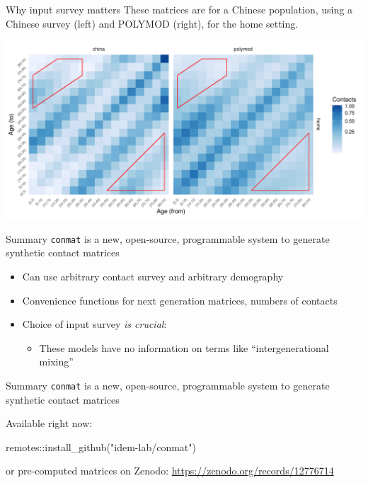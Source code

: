 \documentclass[
  14pt,
  ignorenonframetext,
  aspectratio=169,
]{beamer}
\newenvironment{Shaded}{\begin{snugshade}}{\end{snugshade}}
\newcommand{\FunctionTok}[1]{\textcolor[rgb]{0.28,0.35,0.67}{#1}}
\newcommand{\NormalTok}[1]{\textcolor[rgb]{0.00,0.23,0.31}{#1}}
\newcommand{\SpecialCharTok}[1]{\textcolor[rgb]{0.37,0.37,0.37}{#1}}
\newcommand{\StringTok}[1]{\textcolor[rgb]{0.13,0.47,0.30}{#1}}
\providecommand{\tightlist}{%
  \setlength{\itemsep}{0pt}\setlength{\parskip}{0pt}}\usepackage{longtable,booktabs,array}
\begin{document}
\begin{frame}{Why input survey matters}
\label{why-input-survey-matters-1}
These matrices are for a Chinese population, using a Chinese survey
(left) and POLYMOD (right), for the home setting.

\begin{center}
\includegraphics{index_files/figure-beamer/unnamed-chunk-8-1.pdf}
\end{center}
\end{frame}

\begin{frame}[fragile]{Summary}
\label{summary}
\texttt{conmat} is a new, open-source, programmable system to generate
synthetic contact matrices

\begin{itemize}[<+->]
\tightlist
\item
  Can use arbitrary contact survey and arbitrary demography
\item
  Convenience functions for next generation matrices, numbers of
  contacts
\item
  Choice of input survey \emph{is crucial}:

  \begin{itemize}[<+->]
  \tightlist
  \item
    These models have no information on terms like ``intergenerational
    mixing''
  \end{itemize}
\end{itemize}
\end{frame}

\begin{frame}[fragile]{Summary}
\label{summary-1}
\texttt{conmat} is a new, open-source, programmable system to generate
synthetic contact matrices

Available right now:

\begin{Shaded}
\begin{Highlighting}[]
\NormalTok{remotes}\SpecialCharTok{::}\FunctionTok{install\_github}\NormalTok{(}\StringTok{"idem{-}lab/conmat"}\NormalTok{)}
\end{Highlighting}
\end{Shaded}

or pre-computed matrices on Zenodo:
\url{https://zenodo.org/records/12776714}
\end{frame}
\end{document}
